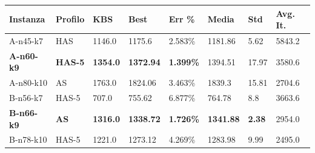\documentclass[11pt,a4paper]{article}
\begin{document}
\begin{table}[h]
\centering
\begin{tabular}{|l|l|l|l|l|l|l|l|}
\hline
\rowcolor[HTML]{EFEFEF} 
{\color[HTML]{343434} \textbf{Instanza}} & {\color[HTML]{343434} \textbf{Profilo}} & {\color[HTML]{343434} \textbf{KBS}} & {\color[HTML]{343434} \textbf{Best}} & {\color[HTML]{343434} \textbf{Err \%}} & {\color[HTML]{343434} \textbf{Media}} & {\color[HTML]{343434} \textbf{Std}} & {\color[HTML]{343434} \textbf{Avg. It.}} \\ \hline
A-n45-k7                        & HAS                                     & 1146.0                              & 1175.6                               & 2.583\%                                & 1181.86                               & 5.62                                & 5843.2                                   \\ \hline
\rowcolor[HTML]{ECF4FF} 
\textbf{A-n60-k9}                        & \textbf{HAS-5}                          & \textbf{1354.0}                     & \textbf{1372.94}                     & \textbf{1.399\%}                       & 1394.51                               & 17.97                               & 3580.6                                   \\ \hline
A-n80-k10                       & AS                                      & 1763.0                              & 1824.06                              & 3.463\%                                & 1839.3                                & 15.81                               & 2704.6                                   \\ \hline
\rowcolor[HTML]{ECF4FF} 
B-n56-k7                        & HAS-5                                   & 707.0                               & 755.62                               & 6.877\%                                & 764.78                                & 8.8                                 & 3663.6                                   \\ \hline
\textbf{B-n66-k9}                        & \textbf{AS}                             & \textbf{1316.0}                     & \textbf{1338.72}                     & \textbf{1.726\%}                       & \textbf{1341.88}                      & \textbf{2.38}                       & 2954.0                                   \\ \hline
B-n78-k10                       & HAS-5                                   & 1221.0                              & 1273.12                              & 4.269\%                                & 1283.98                               & 9.99                                & 2495.0                                   \\ \hline

\end{tabular}
\end{table}
\end{document}
